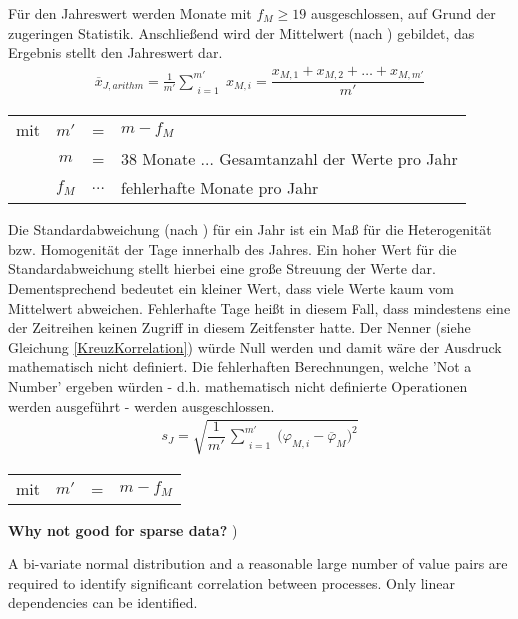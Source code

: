 \documentclass[a4paper,10pt]{scrbook}
\begin{document}
Für den Jahreswert werden Monate mit $f_{M} \geqslant 19$ ausgeschlossen, auf Grund der zugeringen Statistik. Anschließend wird der Mittelwert (nach \cite{TaschenbuchMathematik}) gebildet, das Ergebnis stellt den Jahreswert dar. 
\begin{align}
\overline{x}_{J,arithm} = \frac{1}{m'} \sum_{\substack{i=1}}^{m'} x_{M,i} = \dfrac{x_{M,1}+x_{M,2}+ \ldots +x_{M,m'}}{m'}
\end{align}
\begin{table}[H]
\begin{tabular}{rccl}
mit  & $m'$ & = & $m - f_{M}$\\
	 & $m$ & = & 38 Monate $\ldots$ Gesamtanzahl der Werte pro Jahr\\
	 & $f_{M}$ & $\ldots$ & fehlerhafte Monate pro Jahr\\
\end{tabular}
\end{table}
Die Standardabweichung (nach \cite{TaschenbuchStatistik}) für ein Jahr ist ein Maß für die Heterogenität bzw. Homogenität der Tage innerhalb des Jahres. Ein hoher Wert für die Standardabweichung stellt hierbei eine große Streuung der Werte dar. Dementsprechend bedeutet ein kleiner Wert, dass viele Werte kaum vom Mittelwert abweichen. Fehlerhafte Tage heißt in diesem Fall, dass mindestens eine der Zeitreihen keinen Zugriff in diesem Zeitfenster hatte. Der Nenner (siehe Gleichung \ref{KreuzKorrelation}) würde Null werden und damit wäre der Ausdruck mathematisch nicht definiert. Die fehlerhaften Berechnungen, welche 'Not a Number' ergeben würden - d.h. mathematisch nicht definierte Operationen werden ausgeführt - werden ausgeschlossen.
\begin{align}
s_{J} = \sqrt{\dfrac{1}{m'}\,\sum_{\substack{i=1}}^{m'} \bigl( \varphi_{M,i}-\overline{\varphi}_{M}\bigr)^{2}}
\label{Standardabweichung}
\end{align}
\begin{table}[H]
\begin{tabular}{rccl}
mit  & $m'$ & = & $m - f_{M}$\\
\end{tabular}
\end{table}

\textbf{Why not good for sparse data?}
\label{crosscorrelation.con})

A bi-variate normal distribution and a reasonable large number of value pairs are required to identify significant correlation between processes. Only linear dependencies can be identified. 
\end{document}
